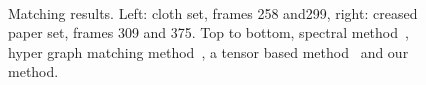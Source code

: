 \begin{figure}[!ht]
\begin{minipage}[b]{0.4\textwidth}
{            }%
        \end{minipage}\\%
        \addtocounter{subfigure}{-1}%
        \hspace{-8ex}
        \begin{minipage}[b]{0.4\textwidth}
        \end{minipage}%
        \hspace{10mm}%
        \begin{minipage}[b]{0.4\textwidth}
        \end{minipage}%
        \caption{Matching results. Left: cloth set, frames 258 and299, right: creased paper set, frames 309  and 375. Top to bottom, spectral method~\cite{Cour06}, hyper graph matching method~\cite{Zass08}, a tensor based method~\cite{Duchenne_etal09} and our method.}
\label{fig:mini:deformablematchingimages} %
\end{figure}%
